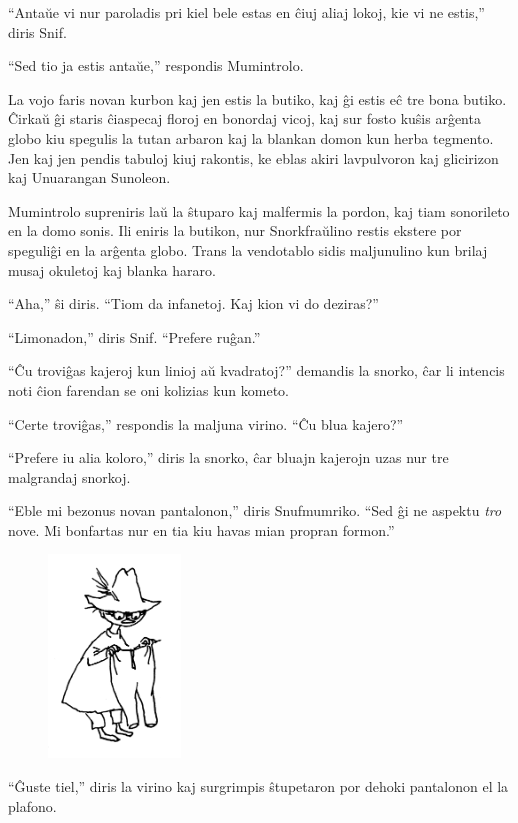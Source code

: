 ``Antaŭe vi nur paroladis pri kiel bele estas en ĉiuj aliaj lokoj, kie vi ne estis,'' diris Snif.

``Sed tio ja estis antaŭe,'' respondis Mumintrolo.

La vojo faris novan kurbon kaj jen estis la butiko, kaj ĝi estis eĉ tre bona butiko. Ĉirkaŭ ĝi staris ĉiaspecaj floroj en bonordaj vicoj, kaj sur fosto kuŝis arĝenta globo kiu spegulis la tutan arbaron kaj la blankan domon kun herba tegmento. Jen kaj jen pendis tabuloj kiuj rakontis, ke eblas akiri lavpulvoron kaj glicirizon kaj Unuarangan Sunoleon.

Mumintrolo supreniris laŭ la ŝtuparo kaj malfermis la pordon, kaj tiam sonorileto en la domo sonis. Ili eniris la butikon, nur Snorkfraŭlino restis ekstere por speguliĝi en la arĝenta globo. Trans la vendotablo sidis maljunulino kun brilaj musaj okuletoj kaj blanka hararo.

``Aha,'' ŝi diris. ``Tiom da infanetoj. Kaj kion vi do deziras?''

``Limonadon,'' diris Snif. ``Prefere ruĝan.''

``Ĉu troviĝas kajeroj kun linioj aŭ kvadratoj?'' demandis la snorko, ĉar li intencis noti ĉion farendan se oni kolizias kun kometo.

``Certe troviĝas,'' respondis la maljuna virino. ``Ĉu blua kajero?''

``Prefere iu alia koloro,'' diris la snorko, ĉar bluajn kajerojn uzas nur tre malgrandaj snorkoj.

``Eble mi bezonus novan pantalonon,'' diris Snufmumriko. ``Sed ĝi ne aspektu \emph{tro} nove. Mi bonfartas nur en tia kiu havas mian propran formon.''

\begin{figure}[htbp]
\centering
\includegraphics[width=100pt,height=153pt]{6-3.png}
\caption{}
\label{6-3}
\end{figure}

``Ĝuste tiel,'' diris la virino kaj surgrimpis ŝtupetaron por dehoki pantalonon el la plafono.

